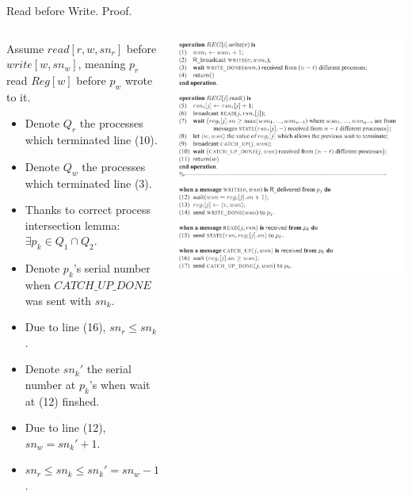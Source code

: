 \begin{frame}{Read before Write. Proof.}
    \begin{columns}[T]
        \begin{column}{.5\textwidth}
            Assume $read[r,w,sn_r]$ before $write[w,sn_w]$, meaning $p_r$ read $Reg[w]$
            before $p_w$ wrote to it.
            \begin{itemize}
                \item Denote $Q_r$ the processes which terminated line (10).
                \item Denote $Q_w$ the processes which terminated line (3).
                \item Thanks to correct process intersection lemma: $\exists p_k\in Q_1\cap Q_2$.
                \item Denote $p_k$'s serial number when $CATCH\_UP\_DONE$ was sent with $sn_k$. 
                \item Due to line (16), $sn_r\leq sn_k$.
                \item Denote $sn_k'$ the serial number at $p_k$'s when wait at (12) finshed.
                \item Due to line (12), $sn_w=sn_k'+1$.
                \item $sn_r\leq sn_k\leq sn_k'= sn_w-1\Rightarrow sn_r < sn_w$.
            \end{itemize}
        \end{column}
        \begin{column}{.5\textwidth}
            \includegraphics[scale=.465]{resources/mainalg.png}
        \end{column}
    \end{columns}
\end{frame}

